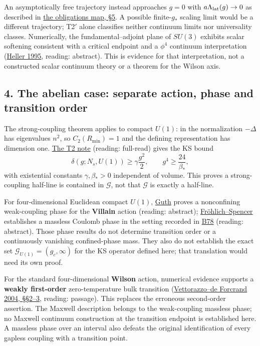 \documentclass[11pt,a4paper]{article}
\begin{document}
An asymptotically free trajectory instead approaches \(g=0\) with
\(a\Lambda_{\rm lat}(g)\to0\) as described in
\href{mass-gap-obligations-lattice.md}{the obligations map, §5}. A
possible finite-\(g_*\) scaling limit would be a different trajectory;
T2\('\) alone classifies neither continuum limits nor universality
classes. Numerically, the fundamental--adjoint plane of \(SU(3)\)
exhibits scalar softening consistent with a critical endpoint and a
\(\phi^4\) continuum interpretation
(\href{https://arxiv.org/abs/hep-lat/9508009}{Heller 1995}, reading:
abstract). This is evidence for that interpretation, not a constructed
scalar continuum theory or a theorem for the Wilson axis.

\subsection{4. The abelian case: separate action, phase and transition
order}\label{the-abelian-case-separate-action-phase-and-transition-order}

The strong-coupling theorem applies to compact \(U(1)\): in the
normalization \(-\Delta\) has eigenvalues \(n^2\), so
\(C_2(R_{\min})=1\) and the defining representation has dimension one.
\href{strong-coupling-uniform-gap.md}{The T2 note} (reading: full-read)
gives the KS bound \[\delta(g;N_s,U(1))\ge\gamma\frac{g^2}{2},\qquad
g^4\ge\frac{24}{\beta_*},\] with existential constants
\(\gamma,\beta_*>0\) independent of volume. This proves a
strong-coupling half-line is contained in \(\mathcal G\), not that
\(\mathcal G\) is exactly a half-line.

For four-dimensional Euclidean compact \(U(1)\),
\href{https://doi.org/10.1103/PhysRevD.21.2291}{Guth} proves a
nonconfining weak-coupling phase for the \textbf{Villain} action
(reading: abstract);
\href{https://doi.org/10.1007/BF01213610}{Fröhlich--Spencer} establishes
a massless Coulomb phase in the setting recorded in
\href{../references/batches/B78.md}{B78} (reading: abstract). Those
phase results do not determine transition order or a continuously
vanishing confined-phase mass. They also do not establish the exact set
\(\mathcal G_{U(1)}=(g_c,\infty)\) for the KS operator defined here;
that translation would need its own proof.

For the standard four-dimensional \textbf{Wilson} action, numerical
evidence supports a \textbf{weakly first-order} zero-temperature bulk
transition
(\href{https://arxiv.org/html/hep-lat/0409135v2}{Vettorazzo--de Forcrand
2004, §§2--3}, reading: passage). This replaces the erroneous
second-order assertion. The Maxwell description belongs to the
weak-coupling massless phase; no Maxwell continuum construction at the
transition endpoint is established here. A massless phase over an
interval also defeats the original identification of every gapless
coupling with a transition point.
\end{document}
